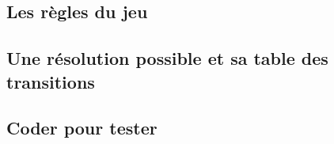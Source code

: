 \subsection{Les règles du jeu}


\subsection{Une résolution possible et sa table des transitions}


\subsection{Coder pour tester}



%
%	
%
%
%
%	
%
%
%
%
%	
